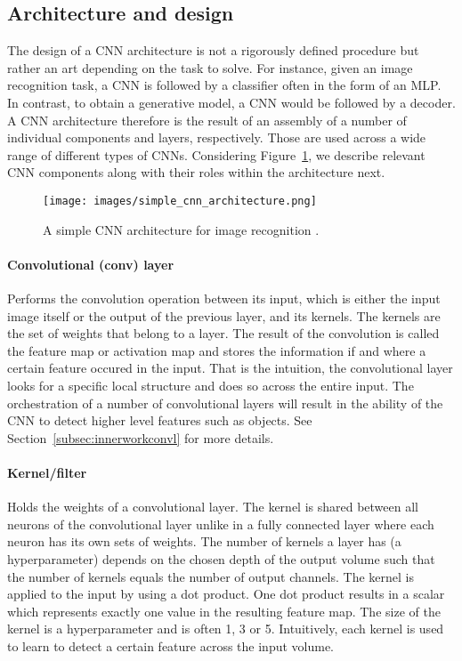 \documentclass[a4paper,12pt]{report}
\begin{document}
\subsection{Architecture and design}
The design of a CNN architecture is not a rigorously defined procedure but rather an art depending on the task to solve. For instance, given an image recognition task, a CNN is followed by a classifier often in the form of an MLP. In contrast, to obtain a generative model, a CNN would be followed by a decoder. A CNN architecture therefore is the result of an assembly of a number of individual components and layers, respectively. Those are used across a wide range of different types of CNNs. Considering Figure~\ref{fig:simple_cnn_arch}, we describe relevant CNN components along with their roles within the architecture  next. 
\begin{figure}[H]
\centering
\texttt{[image: images/simple\_cnn\_architecture.png]}
\caption{A simple CNN architecture for image recognition \cite{cnn_arch_article}.}
\label{fig:simple_cnn_arch}
\end{figure}

\paragraph{Convolutional (conv) layer} Performs the convolution operation between its input, which is either the input image itself or the output of the previous layer, and its kernels. The kernels are the set of weights that belong to a layer. The result of the convolution is called the feature map or activation map and stores the information if and where a certain feature occured in the input. That is the intuition, the convolutional layer looks for a specific local structure and does so across the entire input. The orchestration of a number of convolutional layers will result in the ability of the CNN to detect higher level features such as objects. See Section~\ref{subsec:innerworkconvl} for more details. 

\paragraph{Kernel/filter            } Holds the weights of a convolutional layer. The kernel is shared between all neurons of the convolutional layer unlike in a fully connected layer where each neuron has its own sets of weights. The number of kernels a layer has (a hyperparameter) depends on the chosen depth of the output volume such that the number of kernels equals the number of output channels. The kernel is applied to the input by using a dot product. One dot product results in a scalar which represents exactly one value in the resulting feature map. The size of the kernel is a hyperparameter and is often 1, 3 or 5. Intuitively, each kernel is used to learn to detect a certain feature across the input volume.
\end{document}

